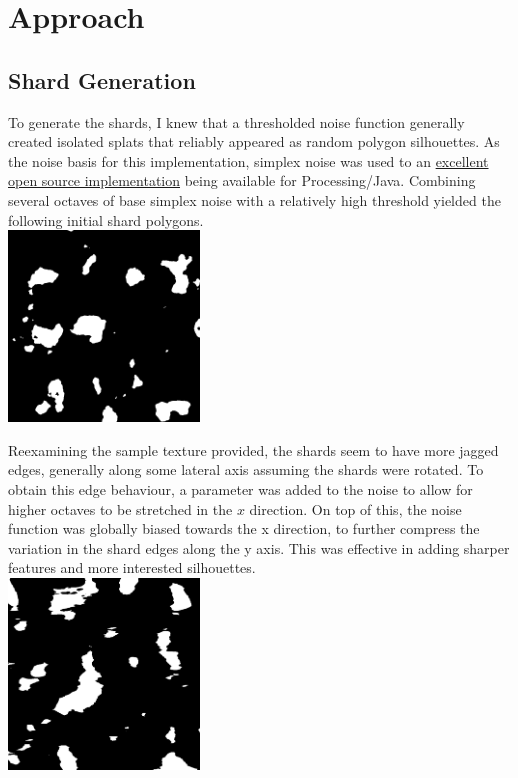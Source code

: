 \documentclass[a4paper, 11pt, titlepage]{article}
\begin{document}
\section{Approach}
\subsection{Shard Generation}
To generate the shards, I knew that a thresholded noise function generally
created isolated splats that reliably appeared as random polygon silhouettes.
As the noise basis for this implementation, simplex noise was used to an
\href{https://gist.github.com/kibotu/1cad8664c8b181cdc4e2}{excellent open source
implementation} being available for Processing/Java. Combining several octaves of
base simplex noise with a relatively high threshold yielded the following initial
shard polygons. \\

 {
    \includegraphics[width=2.0in]{images/ex-simplex-threshold.png}
}

Reexamining the sample texture provided, the shards seem to have more jagged
edges, generally along some lateral axis assuming the shards were rotated. To
obtain this edge behaviour, a parameter was added to the noise to allow for
higher octaves to be stretched in the $x$ direction. On top of this, the noise
function was globally biased towards the x direction, to further compress the
variation in the shard edges along the y axis. This was effective in
adding sharper features and more interested silhouettes. \\

 {
    \includegraphics[width=2.0in]{images/ex-simplex-peaks.png}
}
\end{document}
